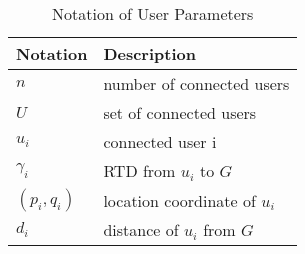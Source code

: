 \begin{table}[!ht]
\centering
\caption{Notation of User Parameters}
\begin{tabular}{| l | l | }
	\hline
	\bf{Notation} & \bf{Description} \\
	\hline
    $n$ & number of connected users \\
    \hline    
    ${U}$ & set of connected users \\
    \hline
	${u_i}$ & connected user i \\
    \hline
    ${\gamma}_{i}$ & RTD from $u_i$ to $G$ \\
    \hline
    $(p_i, q_i)$ & location coordinate of $u_i$ \\
    \hline    
    $d_i$ & distance of $u_i$ from $G$ \\
    \hline    
\end{tabular}
\label{tab:user}
\end{table}